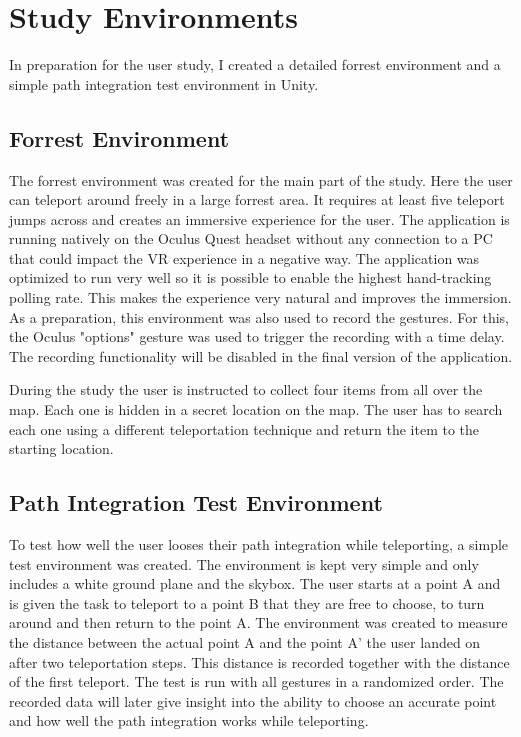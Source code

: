 
\section{Study Environments}
In preparation for the user study, I created a detailed forrest environment and a simple path integration test environment in Unity.



\subsection{Forrest Environment}

The forrest environment was created for the main part of the study. Here the user can teleport around freely in a large forrest area. It requires at least five teleport jumps across and creates an immersive experience for the user. The application is running natively on the Oculus Quest headset without any connection to a PC that could impact the VR experience in a negative way. The application was optimized to run very well so it is possible to enable the highest hand-tracking polling rate. This makes the experience very natural and improves the immersion. As a preparation, this environment was also used to record the gestures. For this, the Oculus "options" gesture was used to trigger the recording with a time delay. The recording functionality will be disabled in the final version of the application. %

During the study the user is instructed to collect four items from all over the map. Each one is hidden in a secret location on the map. The user has to search each one using a different teleportation technique and return the item to the starting location. 


\subsection{Path Integration Test Environment} %
To test how well the user looses their path integration while teleporting, a simple test environment was created. The environment is kept very simple and only includes a white ground plane and the skybox. The user starts at a point A and is given the task to teleport to a point B that they are free to choose, to turn around and then return to the point A. The environment was created to measure the distance between the actual point A and the point A' the user landed on after two teleportation steps. This distance is recorded together with the distance of the first teleport. The test is run with all gestures in a randomized order. The recorded data will later give insight into the ability to choose an accurate point and how well the path integration works while teleporting.
